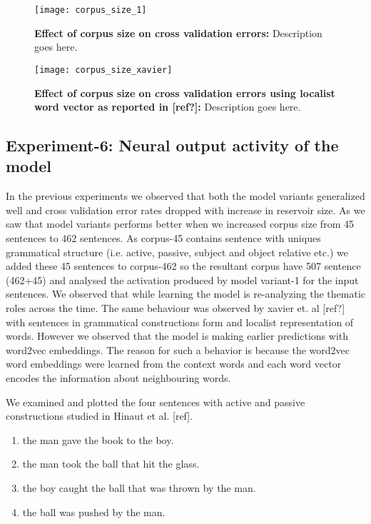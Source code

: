 {{\begin{figure}[hbtp]
\centering
\texttt{[image: corpus\_size\_1]}
\caption[Effect of corpus size on Word2Vec-ESN model]{\textbf{Effect of corpus size on cross validation errors:} Description goes here.}
\label{fig:corpus_size_1}
\end{figure}


\begin{figure}[hbtp]
\centering
\texttt{[image: corpus\_size\_xavier]}
\caption[Effect of reservoir size on Word2Vec-ESNM model variant]{\textbf{Effect of corpus size on cross validation errors using localist word vector as reported in [ref?]:} Description goes here.}
\label{fig:corpus_size_xavier}
\end{figure}


\newpage

\subsection{Experiment-6: Neural output activity of the model}

In the previous experiments we observed that both the model variants generalized well and cross validation error rates dropped with increase in reservoir size. As we saw that model variants performs better when we increased corpus size from 45 sentences to 462 sentences. As corpus-45 contains sentence with uniques grammatical structure (i.e. active, passive, subject and object relative etc.) we added these 45 sentences to corpus-462 so the resultant corpus have 507 sentence (462+45) and analysed the activation produced by model variant-1 for the input sentences. We observed that while learning the model is re-analyzing the thematic roles across the time. The same behaviour was observed by xavier et. al [ref?] with sentences in grammatical constructions form and localist representation of words. However we observed that the model is making earlier predictions with word2vec embeddings. The reason for such a behavior is because the word2vec word embeddings were learned from the context words and each word vector encodes the information about neighbouring words. 

We examined and plotted the four sentences with active and passive constructions studied in Hinaut et al. [ref].

\begin{enumerate}[noitemsep]
\item the man gave the book to the boy. \label{eg-1:or-sent-17}
\item the man took the ball that hit the glass. \label{eg-1:or-sent-23}
\item the boy caught the ball that was thrown by the man.  \label{eg-1:or-sent-27} 
\item the ball was pushed by the man.  \label{eg-1:or-sent-16}
\end{enumerate}

}}
